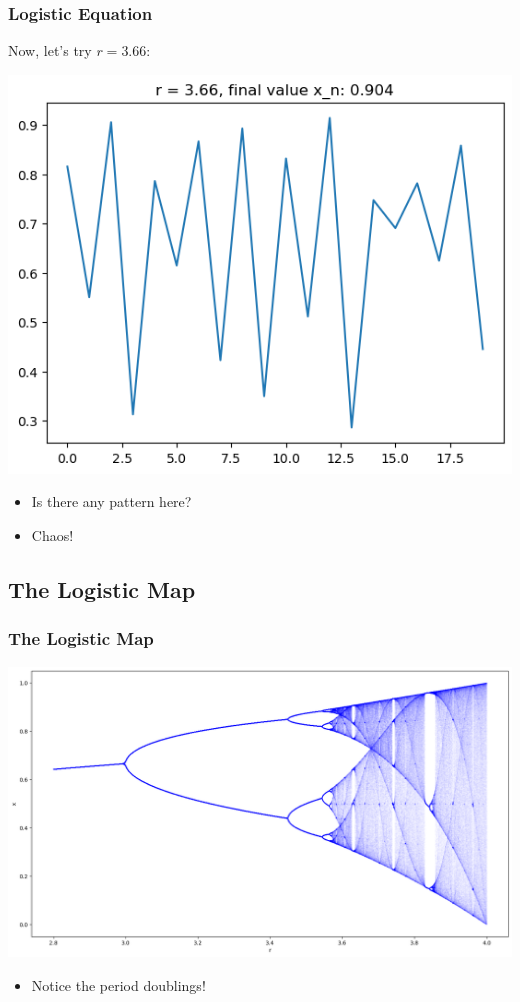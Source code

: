 \documentclass[9pt]{beamer}
\begin{document}
\begin{frame}
	\frametitle{Logistic Equation}

	Now, let's try \( r = 3.66 \):

	\begin{center}
		\includegraphics[scale=0.4]{r=3.66.png}
	\end{center}

	\pause 
	\begin{itemize}
		\item Is there any pattern here?
			\pause 
		\item Chaos!
	\end{itemize}
\end{frame}

\subsection{The Logistic Map}


\begin{frame}

	\frametitle{The Logistic Map}
	
	\begin{center}
		\includegraphics[width=\textwidth]{logistic-map.png}
	\end{center}
	\begin{itemize}
		\item Notice the period doublings!  
	\end{itemize}
\end{frame}
\end{document}
